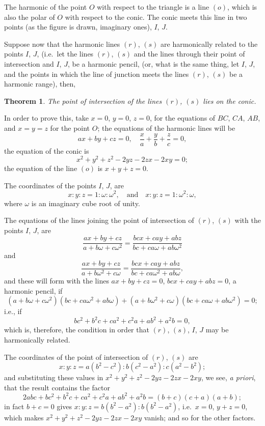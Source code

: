 \documentclass[11pt,a4paper]{book}
\newtheorem*{theorem}{Theorem}
\begin{document}
The harmonic of the point $O$ with respect to the triangle is a line $(o)$, which is also the polar of $O$ with respect to the conic. The conic meets this line in two points (as the figure is drawn, imaginary ones), $I$, $J$.

Suppose now that the harmonic lines $(r)$, $(s)$ are harmonically related to the points $I$, $J$, (i.e.\ let the lines $(r)$, $(s)$ and the lines through their point of intersection and $I$, $J$, be a harmonic pencil, (or, what is the same thing, let $I$, $J$, and the points in which the line of junction meets the lines $(r)$, $(s)$ be a harmonic range), then,

\begin{theorem}
The point of intersection of the lines $(r)$, $(s)$ lies on the conic.
\end{theorem}

In order to prove this, take $x=0$, $y=0$, $z=0$, for the equations of $BC$, $CA$, $AB$, and $x=y=z$ for the point $O$; the equations of the harmonic lines will be
\[
ax + by + cz = 0,\quad
\frac{x}{a} + \frac{y}{b} + \frac{z}{c} = 0,
\]
the equation of the conic is
\[
x^2 + y^2 + z^2 - 2yz - 2zx - 2xy = 0;
\]
the equation of the line $(o)$ is $x + y + z = 0$.

The coordinates of the points $I$, $J$, are
\[
x : y : z = 1 : \omega : \omega^2,\quad\text{and}\quad
x : y : z = 1 : \omega^2 : \omega,
\]
where $\omega$ is an imaginary cube root of unity.

The equations of the lines joining the point of intersection of $(r)$, $(s)$ with the points $I$, $J$, are
\[
\frac{ax+by+cz}{a+b\omega+c\omega^2}
= \frac{bcx+cay+abz}{bc+ca\omega+ab\omega^2}
\]
and
\[
\frac{ax+by+cz}{a+b\omega^2+c\omega}
= \frac{bcx+cay+abz}{bc+ca\omega^2+ab\omega},
\]
and these will form with the lines $ax+by+cz=0$, $bcx+cay+abz=0$, a harmonic pencil, if
\[
(a+b\omega+c\omega^2)(bc+ca\omega^2+ab\omega)
+ (a+b\omega^2+c\omega)(bc+ca\omega+ab\omega^2) = 0;
\]
i.e., if
\[
bc^2 + b^2c + ca^2 + c^2a + ab^2 + a^2b = 0,
\]
which is, therefore, the condition in order that $(r)$, $(s)$, $I$, $J$ may be harmonically related.

The coordinates of the point of intersection of $(r)$, $(s)$ are
\[
x : y : z = a(b^2-c^2) : b(c^2-a^2) : c(a^2-b^2);
\]
and substituting these values in $x^2+y^2+z^2-2yz-2zx-2xy$, we see, \textit{a priori}, that the result contains the factor
\[
2abc + bc^2 + b^2c + ca^2 + c^2a + ab^2 + a^2b
= (b+c)(c+a)(a+b);
\]
in fact $b+c=0$ gives $x:y:z=b(b^2-a^2):b(b^2-a^2)$, i.e.\ $x=0$, $y+z=0$, which makes $x^2+y^2+z^2-2yz-2zx-2xy$ vanish; and so for the other factors.
\end{document}
